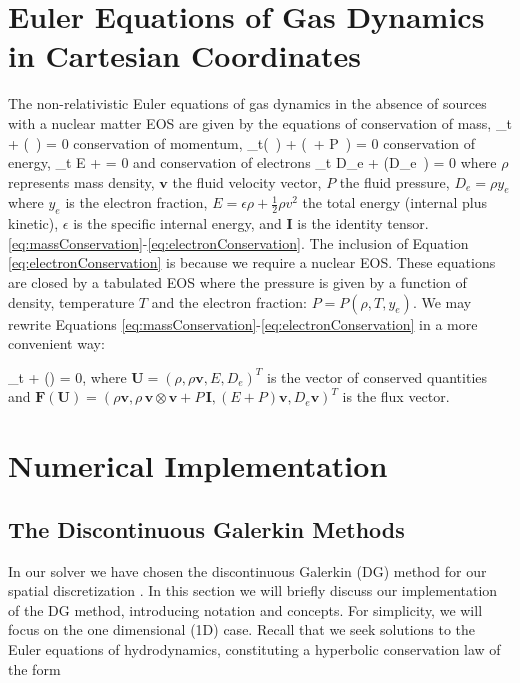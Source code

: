 \documentclass[onecolumn]{aastex62}
\begin{document}
\section{Euler Equations of Gas Dynamics in Cartesian Coordinates}
\label{sec:eulereq}
The non-relativistic Euler equations of gas dynamics
\citep[see, e.g.,][for details in the case of an ideal EOS]{leveque:2002}
in the absence of sources with a nuclear matter EOS are given by
the equations of conservation of mass,
\beq
  \partial_{t} \rho + \divergence{} (\rho\,  ) = 0
  \label{eq:massConservation}
\eeq
conservation of momentum,
\beq
  \partial_{t}(\rho\,  ) + \divergence{}(\rho\,   \otimes {} + P\, ) = 0
  \label{eq:momentumConservation}
\eeq
conservation of energy,
\beq
  \partial_{t} E + \divergence{} = 0
  \label{eq:energyConservation}
\eeq
and conservation of electrons
\beq
  \partial_{t} D_{e} + \divergence{}(D_{e}\, ) = 0
  \label{eq:electronConservation}
\eeq
where $\rho$ represents mass density, $\mathbf{v}$ the fluid velocity vector,
$P$ the fluid pressure, $D_{e}=\rho y_e$ where $y_e$ is the electron fraction,
$E=\epsilon \rho +\frac{1}{2}\rho v^2$ the total energy (internal plus kinetic),
$\epsilon$ is the specific internal energy, and $\mathbf{I}$ is the identity tensor.
\eqref{eq:massConservation}-\eqref{eq:electronConservation}. The inclusion of
Equation \eqref{eq:electronConservation} is because we require a nuclear EOS.
These equations are closed by a tabulated EOS where the pressure is given by a function of
density, temperature $T$ and the electron fraction: $P = P(\rho, T, y_e)$.
We may rewrite Equations \eqref{eq:massConservation}-\eqref{eq:electronConservation}
in a more convenient way:

\beq
  \partial_{t} + \divergence{}() = 0,
  \label{eq:conservation}
\eeq
where $\mathbf{U} =(\rho,\rho \mathbf{v},E, D_{e})^{T}$ is the vector of conserved quantities
and $\mathbf{F}(\mathbf{U})=(\rho \mathbf{v},
\rho\, \mathbf{v} \otimes \mathbf{v} + P\, \mathbf{I},(E+P)\mathbf{v}, D_{e}\mathbf{v})^{T}$
is the flux vector.

\section{Numerical Implementation}
\label{sec:DG}

\subsection{The Discontinuous Galerkin Methods}
In our solver we have chosen the discontinuous Galerkin (DG) method
for our spatial discretization \citep[see e.g.,][]{schaal:2015, zhang:2010a, cockburn:1998, cockburn:1989}.
In this section we will briefly discuss our
implementation of the DG method, introducing notation and concepts.
For simplicity, we will focus on the one dimensional (1D) case. Recall that
we seek solutions to the Euler equations of hydrodynamics, constituting a
hyperbolic conservation law of the form
\end{document}
